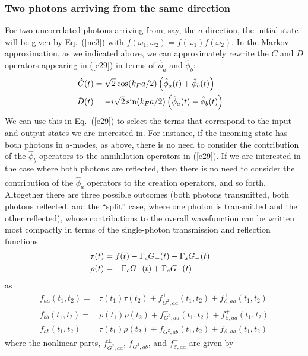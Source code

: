 \documentclass[aps,pra,twocolumn,floatfix,superscriptaddress]{revtex4}
\begin{document}
\subsubsection{Two photons arriving from the same direction}
For two uncorrelated photons arriving from, say, the $a$ direction, the initial state will be given by Eq.~(\ref{ne3}) with $f(\omega_1,\omega_2) = f(\omega_1)f(\omega_2)$.  In the Markov approximation, as we indicated above, we can approximately rewrite the $C$ and $D$ operators appearing in (\ref{e29}) in terms of $\hat\phi_a$ and $\hat\phi_b$:
\begin{align}
\hat C(t) &= \sqrt 2 \cos(k_F a/2)  \left(\hat\phi_a(t)+\hat\phi_b(t)\right) \cr
\hat D(t) &= -i{\sqrt 2} \sin(k_F a/2) \left(\hat\phi_a(t)-\hat\phi_b(t)\right)
\end{align}
We can use this in Eq.~(\ref{e29}) to select the terms that correspond to the input and output states we are interested in.  For instance, if the incoming state has both photons in $a$-modes, as above, there is no need to consider the contribution of the $\hat\phi_b$ operators to the annihilation operators in (\ref{e29}).  If we are interested in the case where both photons are reflected, then there is no need to consider the contribution of the $\hat\phi_a^\dagger$ operators to the creation operators, and so forth.  Altogether there are three possible outcomes (both photons transmitted, both photons reflected, and the ``split'' case, where one photon is transmitted and the other reflected), whose contributions to the overall wavefunction can be written most compactly in terms of the single-photon transmission and reflection functions
\begin{align}
\tau(t) &= f(t)-\Gamma_c G_+(t) -\Gamma_s G_-(t) \cr
\rho(t) &= -\Gamma_c G_+(t) +\Gamma_s G_-(t) 
\label{ne41}
\end{align} 
as 
\begin{subequations}
\begin{align}
f_{aa}(t_1,t_2) = &\tau(t_1)\tau(t_2) +f_{G^2,aa}^{+}(t_1,t_2)+f_{\mathcal{E},aa}^{+}(t_1,t_2) 
\label{e40a} \\
f_{bb}(t_1,t_2) = & \rho(t_1)\rho(t_2)+f_{G^2,aa}^{-}(t_1,t_2)+ f_{\mathcal{E},aa}^{ + }(t_1,t_2) \label{e40b} \\
f_{ab}(t_1,t_2) = &\tau(t_1)\rho(t_2)+ f_{G^2,ab}(t_1,t_2)+f_{\mathcal{E},aa}^{-}(t_1,t_2)
\label{e40c}
\end{align}
\label{e40}
\end{subequations}
where the nonlinear parts, $f_{G^2,aa}^{\pm}$, $f_{G^2,ab}$, and $f_{\mathcal{E},aa}^{+}$ are given by
\end{document}
